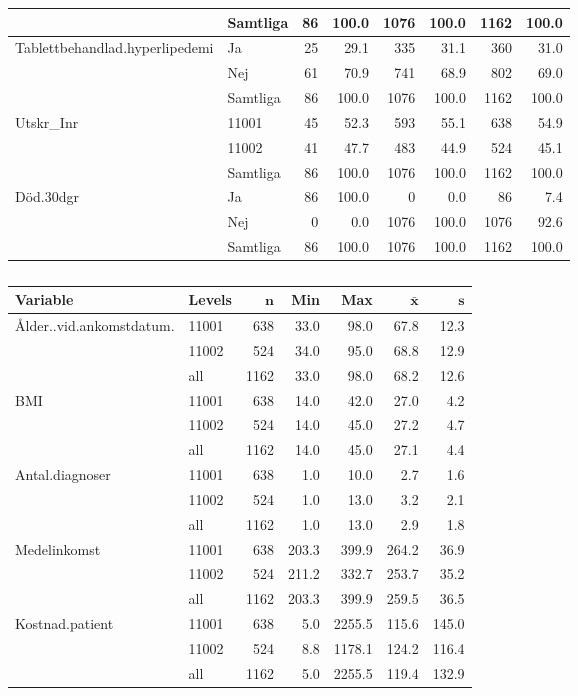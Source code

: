 \begin{table}[htbp]
{\begin{tabular}{ll|rr|rr|rr}
   \hline
 & Samtliga & 86 & 100.0 & 1076 & 100.0 & 1162 & 100.0 \\ 
   \hline
\hline
Tablettbehandlad.hyperlipedemi & Ja & 25 & 29.1 & 335 & 31.1 & 360 & 31.0 \\ 
   & Nej & 61 & 70.9 & 741 & 68.9 & 802 & 69.0 \\ 
   \hline
 & Samtliga & 86 & 100.0 & 1076 & 100.0 & 1162 & 100.0 \\ 
   \hline
\hline
Utskr\_Inr & 11001 & 45 & 52.3 & 593 & 55.1 & 638 & 54.9 \\ 
   & 11002 & 41 & 47.7 & 483 & 44.9 & 524 & 45.1 \\ 
   \hline
 & Samtliga & 86 & 100.0 & 1076 & 100.0 & 1162 & 100.0 \\ 
   \hline
\hline
Död.30dgr & Ja & 86 & 100.0 & 0 & 0.0 & 86 & 7.4 \\ 
   & Nej & 0 & 0.0 & 1076 & 100.0 & 1076 & 92.6 \\ 
   \hline
 & Samtliga & 86 & 100.0 & 1076 & 100.0 & 1162 & 100.0 \\ 
   \hline
\hline
\end{tabular}
}
\end{table}

\begin{table}[htbp]
\centering
\caption{} 
\label{}
{\footnotesize
\begin{tabular}{llrrrrr}
 \textbf{Variable} & \textbf{Levels} & $\mathbf{n}$ & \textbf{Min} & \textbf{Max} & $\mathbf{\bar{x}}$ & $\mathbf{s}$ \\ 
  \hline
Ålder..vid.ankomstdatum. & 11001 &  638 &  33.0 &   98.0 &  67.8 &  12.3 \\ 
   & 11002 &  524 &  34.0 &   95.0 &  68.8 &  12.9 \\ 
   \hline
 & all & 1162 &  33.0 &   98.0 &  68.2 &  12.6 \\ 
   \hline
BMI & 11001 &  638 &  14.0 &   42.0 &  27.0 &   4.2 \\ 
   & 11002 &  524 &  14.0 &   45.0 &  27.2 &   4.7 \\ 
   \hline
 & all & 1162 &  14.0 &   45.0 &  27.1 &   4.4 \\ 
   \hline
Antal.diagnoser & 11001 &  638 &   1.0 &   10.0 &   2.7 &   1.6 \\ 
   & 11002 &  524 &   1.0 &   13.0 &   3.2 &   2.1 \\ 
   \hline
 & all & 1162 &   1.0 &   13.0 &   2.9 &   1.8 \\ 
   \hline
Medelinkomst & 11001 &  638 & 203.3 &  399.9 & 264.2 &  36.9 \\ 
   & 11002 &  524 & 211.2 &  332.7 & 253.7 &  35.2 \\ 
   \hline
 & all & 1162 & 203.3 &  399.9 & 259.5 &  36.5 \\ 
   \hline
Kostnad.patient & 11001 &  638 &   5.0 & 2255.5 & 115.6 & 145.0 \\ 
   & 11002 &  524 &   8.8 & 1178.1 & 124.2 & 116.4 \\ 
   \hline
 & all & 1162 &   5.0 & 2255.5 & 119.4 & 132.9 \\ 
   \hline
\end{tabular}
}

\end{table}

